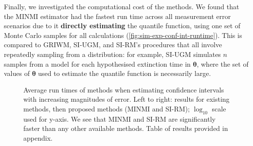 Finally, we investigated the computational cost of the methods. We found that the MINMI estimator had the fastest run time across all measurement error scenarios due to it \textbf{directly estimating} the quantile function, using one set of Monte Carlo samples for all calculations (\autoref{fig:sim-exp-conf-int-runtime}). This is compared to GRIWM, SI-UGM, and SI-RM's procedures that all involve repeatedly sampling from a distribution: for example, SI-UGM simulates $n$ samples from a model for each hypothesised extinction time in $\bm{\theta}$, where the set of values of $\bm{\theta}$ used to estimate the quantile function is necessarily large.
\begin{figure}[ht]
    \centering
    
    \caption{Average run times of methods when estimating confidence intervals with increasing magnitudes of error. Left to right: results for existing methods, then proposed methods (MINMI and SI-RM); $\log_10$ scale used for y-axis. We see that MINMI and SI-RM are significantly faster than any other available methods. Table of results provided in appendix.}
    \label{fig:sim-exp-conf-int-runtime}
\end{figure}